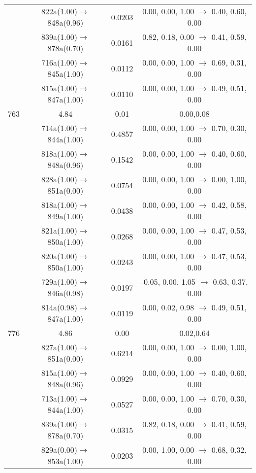 \documentclass[10pt,a4paper]{article}
\begin{document}
\begin{longtable}{c|c|c|c}
 	& 822a(1.00)$\rightarrow$848a(0.96) &	 0.0203 &	 0.00, 0.00, 1.00 $\rightarrow$ 0.40, 0.60, 0.00 \\ 
 	& 839a(1.00)$\rightarrow$878a(0.70) &	 0.0161 &	 0.82, 0.18, 0.00 $\rightarrow$ 0.41, 0.59, 0.00 \\ 
 	& 716a(1.00)$\rightarrow$845a(1.00) &	 0.0112 &	 0.00, 0.00, 1.00 $\rightarrow$ 0.69, 0.31, 0.00 \\ 
 	& 815a(1.00)$\rightarrow$847a(1.00) &	 0.0110 &	 0.00, 0.00, 1.00 $\rightarrow$ 0.49, 0.51, 0.00 \\ 
 \hline763 &	 4.84 &	 0.01 &	 0.00,0.08 \\ 
  	& 714a(1.00)$\rightarrow$844a(1.00) &	 0.4857 &	 0.00, 0.00, 1.00 $\rightarrow$ 0.70, 0.30, 0.00 \\ 
 	& 818a(1.00)$\rightarrow$848a(0.96) &	 0.1542 &	 0.00, 0.00, 1.00 $\rightarrow$ 0.40, 0.60, 0.00 \\ 
 	& 828a(1.00)$\rightarrow$851a(0.00) &	 0.0754 &	 0.00, 0.00, 1.00 $\rightarrow$ 0.00, 1.00, 0.00 \\ 
 	& 818a(1.00)$\rightarrow$849a(1.00) &	 0.0438 &	 0.00, 0.00, 1.00 $\rightarrow$ 0.42, 0.58, 0.00 \\ 
 	& 821a(1.00)$\rightarrow$850a(1.00) &	 0.0268 &	 0.00, 0.00, 1.00 $\rightarrow$ 0.47, 0.53, 0.00 \\ 
 	& 820a(1.00)$\rightarrow$850a(1.00) &	 0.0243 &	 0.00, 0.00, 1.00 $\rightarrow$ 0.47, 0.53, 0.00 \\ 
 	& 729a(1.00)$\rightarrow$846a(0.98) &	 0.0197 &	 -0.05, 0.00, 1.05 $\rightarrow$ 0.63, 0.37, 0.00 \\ 
 	& 814a(0.98)$\rightarrow$847a(1.00) &	 0.0119 &	 0.00, 0.02, 0.98 $\rightarrow$ 0.49, 0.51, 0.00 \\ 
 \hline776 &	 4.86 &	 0.00 &	 0.02,0.64 \\ 
  	& 827a(1.00)$\rightarrow$851a(0.00) &	 0.6214 &	 0.00, 0.00, 1.00 $\rightarrow$ 0.00, 1.00, 0.00 \\ 
 	& 815a(1.00)$\rightarrow$848a(0.96) &	 0.0929 &	 0.00, 0.00, 1.00 $\rightarrow$ 0.40, 0.60, 0.00 \\ 
 	& 713a(1.00)$\rightarrow$844a(1.00) &	 0.0527 &	 0.00, 0.00, 1.00 $\rightarrow$ 0.70, 0.30, 0.00 \\ 
 	& 839a(1.00)$\rightarrow$878a(0.70) &	 0.0315 &	 0.82, 0.18, 0.00 $\rightarrow$ 0.41, 0.59, 0.00 \\ 
 	& 829a(0.00)$\rightarrow$853a(1.00) &	 0.0203 &	 0.00, 1.00, 0.00 $\rightarrow$ 0.68, 0.32, 0.00 \\ 

\end{longtable}
\end{document}
